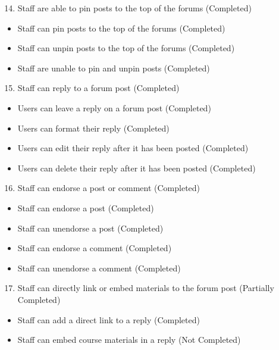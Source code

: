 \begin{enumerate}
    \setcounter{enumi}{13}
    \item Staff are able to pin posts to the top of the forums (Completed)
\end{enumerate}
\begin{itemize}
    \setlength{\itemindent}{1.5em}
    \item Staff can pin posts to the top of the forums (Completed)
    \item Staff can unpin posts to the top of the forums (Completed)
    \item Staff are unable to pin and unpin posts (Completed)
\end{itemize}

\begin{enumerate}
    \setcounter{enumi}{14}
    \item Staff can reply to a forum post (Completed)
\end{enumerate}
\begin{itemize}
    \setlength{\itemindent}{1.5em}
    \item Users can leave a reply on a forum post (Completed)
    \item Users can format their reply (Completed)
    \item Users can edit their reply after it has been posted (Completed)
    \item Users can delete their reply after it has been posted (Completed)
\end{itemize}

\begin{enumerate}
    \setcounter{enumi}{15}
    \item Staff can endorse a post or comment (Completed)
\end{enumerate}
\begin{itemize}
    \setlength{\itemindent}{1.5em}
    \item Staff can endorse a post (Completed)
    \item Staff can unendorse a post (Completed)
    \item Staff can endorse a comment (Completed)
    \item Staff can unendorse a comment (Completed)
\end{itemize}

\begin{enumerate}
    \setcounter{enumi}{16}
    \item Staff can directly link or embed materials to the forum post (Partially Completed)
\end{enumerate}
\begin{itemize}
    \setlength{\itemindent}{1.5em}
    \item Staff can add a direct link to a reply (Completed)
    \item Staff can embed course materials in a reply (Not Completed)
\end{itemize}

